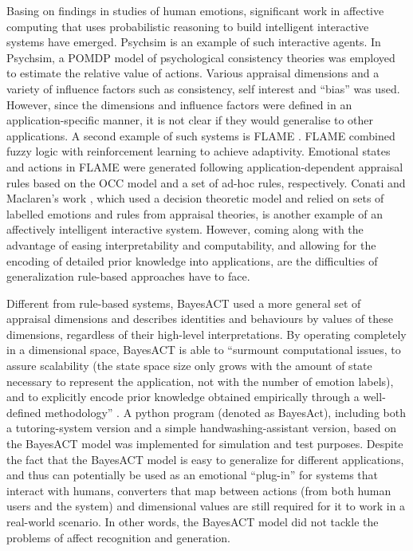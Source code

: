 Basing on findings in studies of human emotions, significant work in affective computing that uses probabilistic reasoning to build intelligent interactive systems have emerged. Psychsim \cite{pynadath2005psychsim} is an example of such interactive agents. In Psychsim, a POMDP model of psychological consistency theories was employed to estimate the relative value of actions. Various appraisal dimensions and a variety of influence factors such as consistency, self interest and ``bias'' was used. However, since the dimensions and influence factors were defined in an application-specific manner, it is not clear if they would generalise to other applications. A second example of such systems is FLAME \cite{el2000flame}. FLAME combined fuzzy logic with reinforcement learning to achieve adaptivity. Emotional states and actions in FLAME were generated following application-dependent appraisal rules based on the OCC model \cite{ortony1990cognitive} and a set of ad-hoc rules, respectively. Conati and Maclaren's work \cite{conati2009empirically}, which used a decision theoretic model and relied on sets of labelled emotions and rules from appraisal theories, is another example of an affectively intelligent interactive system. However, coming along with the advantage of easing interpretability and computability, and allowing for the encoding of detailed prior knowledge into applications, are the difficulties of generalization rule-based approaches have to face.

Different from rule-based systems, BayesACT \cite{hoey2013bayesian} used a more general set of appraisal dimensions and describes identities and behaviours by values of these dimensions, regardless of their high-level interpretations. By operating completely in a dimensional space, BayesACT is able to ``surmount computational issues, to assure scalability (the state space size only grows with the amount of state necessary to represent the application, not with the number of emotion labels), and to explicitly encode prior knowledge obtained empirically through a well-defined methodology'' \cite{hoey2013bayesian}. A python program (denoted as BayesAct), including both a tutoring-system version and a simple handwashing-assistant version, based on the BayesACT model was implemented for simulation and test purposes. Despite the fact that the BayesACT model is easy to generalize for different applications, and thus can potentially be used as an emotional ``plug-in'' for systems that interact with humans, converters that map between actions (from both human users and the system) and dimensional values are still required for it to work in a real-world scenario. In other words, the BayesACT model did not tackle the problems of affect recognition and generation.


